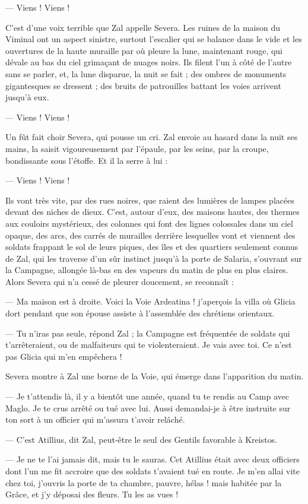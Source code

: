 \documentclass[a4paper, 11pt, oneside, polutonikogreek, french]{article}
\begin{document}
--- Viens ! Viens !

C'est d'une voix terrible que Zal appelle Severa. Les ruines de la maison du Viminal ont un aspect sinistre, surtout l'escalier qui se balance dans le vide et les ouvertures de la haute muraille par où pleure la lune, maintenant rouge, qui dévale au bas du ciel grimaçant de nuages noirs. Ils filent l'un à côté de l'autre sans se parler, et, la lune disparue, la nuit se fait ; des ombres de monuments gigantesques se dressent ; des bruits de patrouilles battant les voies arrivent jusqu'à eux.

--- Viens ! Viens !

Un fût fait choir Severa, qui pousse un cri. Zal envoie au hasard dans la nuit ses mains, la saisit vigoureusement par l'épaule, par les seins, par la croupe, bondissante sous l'étoffe. Et il la serre à lui :

--- Viens ! Viens !

Ils vont très vite, par des rues noires, que raient des lumières de lampes placées devant des niches de dieux. C'est, autour d'eux, des maisons hautes, des thermes aux couloirs mystérieux, des colonnes qui font des lignes colossales dans un ciel opaque, des arcs, des carrés de murailles derrière lesquelles vont et viennent des soldats frappant le sol de leurs piques, des îles et des quartiers seulement connus de Zal, qui les traverse d'un sûr instinct jusqu'à la porte de Salaria, s’ouvrant sur la Campagne, allongée là-bas en des vapeurs du matin de plus en plus claires. Alors Severa qui n'a cessé de pleurer doucement, se reconnaît :

--- Ma maison est à droite. Voici la Voie Ardeatina ! j'aperçois la villa où Glicia dort pendant que son épouse assiste à l'assemblée des chrétiens orientaux.

--- Tu n'iras pas seule, répond Zal ; la Campagne est fréquentée de soldats qui t'arrêteraient, ou de malfaiteurs qui te violenteraient. Je vais avec toi. Ce n'est pas Glicia qui m'en empêchera !

Severa montre à Zal une borne de la Voie, qui émerge dans l'apparition du matin.

--- Je t'attendis là, il y a bientôt une année, quand tu te rendis au Camp avec Maglo. Je te crus arrêté ou tué avec lui. Aussi demandai-je à être instruite sur ton sort à un officier qui m'assura t'avoir relâché.

--- C'est Atillius, dit Zal, peut-être le seul des Gentils favorable à Kreistos.

--- Je ne te l'ai jamais dit, mais tu le sauras. Cet Atillius était avec deux officiers dont l'un me fit accroire que des soldats t'avaient tué en route. Je m'en allai vite chez toi, j'ouvris la porte de ta chambre, pauvre, hélas ! mais habitée par la Grâce, et j'y déposai des fleurs. Tu les as vues !
\end{document}
